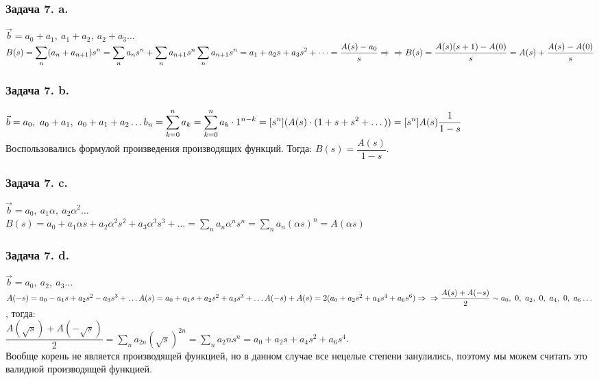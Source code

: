 \documentclass[12pt, letterpaper, twoside]{article}
\begin{document}
\subsubsection*{Задача 7. a.}
$\vec{b} = a_0 + a_1,\ a_1 + a_2,\ a_2 + a_3\dots$\\
$B(s) = \displaystyle\sum_n (a_n + a_{n + 1})s^n = \sum_{n} a_n s^n + \sum_{n} a_{n + 1}s^n\\
\sum_n a_{n + 1}s^n = a_1 + a_2 s + a_3 s^2 + \dots = \frac{A(s) - a_0}{s}\Rightarrow\\
\Rightarrow B(s) = \frac{A(s)(s + 1) - A(0)}{s} = A(s) + \frac{A(s) - A(0)}{s}$
\newpage
\subsubsection*{Задача 7. b.}
$\vec{b} = a_0,\ a_0 + a_1,\ a_0 + a_1 + a_2\dots\\
b_n = \displaystyle \sum_{k = 0}^{n} a_k = \sum_{k = 0}^{n} a_k\cdot 1^{n - k} = [s^n](A(s)\cdot (1 + s + s^2 + \dots)) = [s^n] A(s)\frac{1}{1 - s}$\\
Воспользовались формулой произведения производящих функций. Тогда:
$B(s) = \dfrac{A(s)}{1 - s}$.
\subsubsection*{Задача 7. c.}
$\vec{b} = a_0,\ a_1 \alpha,\ a_2 \alpha^2\dots$\\
$B(s) = a_0 + a_1\alpha s + a_2 \alpha^2 s^2 + a_3 \alpha^3 s^3 + \dots = \displaystyle\sum_{n} a_n \alpha^n s^n = \sum_n a_n (\alpha s)^n = A(\alpha s)$

\subsubsection*{Задача 7. d.}
$\vec{b} = a_0,\ a_2,\ a_3\dots$\\
$A(-s) = a_0 - a_1 s + a_2 s^2 - a_3 s^3 + \dots\\
A(s) = a_0 + a_1 s + a_2 s^2 + a_3 s^3 + \dots\\
A(-s) + A(s) = 2(a_0 + a_2 s^2 + a_4 s^4 + a_6 s^6)\Rightarrow\\
\Rightarrow \dfrac{A(s) + A(-s)}{2} \sim a_0,\ 0,\ a_2,\ 0,\ a_4,\ 0,\ a_6\dots$, тогда:\\
$\dfrac{A(\sqrt{s}) + A(-\sqrt{s})}{2} = \displaystyle \sum_{n} a_{2n}(\sqrt{s})^{2n} = \sum_{n} a_2n s^n = a_0 + a_2 s + a_4 s^2 + a_6 s^4$.\\
Вообще корень не является производящей функцией, но в данном случае все нецелые степени занулились, поэтому мы можем считать это валидной производящей функцией.
\end{document}

